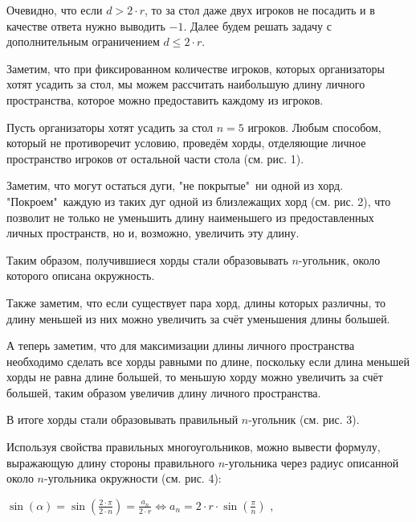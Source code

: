 \solutionSection

Очевидно, что если $d > 2 \cdot r$, то за стол даже двух игроков не посадить и в качестве ответа нужно выводить $-1$. Далее будем решать задачу с дополнительным ограничением $d \le 2 \cdot r$.

Заметим, что при фиксированном количестве игроков, которых организаторы хотят усадить за стол, мы можем рассчитать наибольшую длину личного пространства, которое можно предоставить каждому из игроков.

Пусть организаторы хотят усадить за стол $n = 5$ игроков. Любым способом, который не противоречит условию, проведём хорды, отделяющие личное пространство игроков от остальной части стола (см. рис. 1).

Заметим, что могут остаться дуги, "не покрытые"\ ни одной из хорд. "Покроем"\ каждую из таких дуг одной из близлежащих хорд (см. рис. 2), что позволит не только не уменьшить длину наименьшего из предоставленных личных пространств, но и, возможно, увеличить эту длину.

Таким образом, получившиеся хорды стали образовывать $n$-угольник, около которого описана окружность.





Также заметим, что если существует пара хорд, длины которых различны, то длину меньшей из них можно увеличить за счёт уменьшения длины большей. 

А теперь заметим, что для максимизации длины личного пространства необходимо сделать все хорды равными по длине, поскольку если длина меньшей хорды не равна длине большей, то меньшую хорду можно увеличить за счёт большей, таким образом увеличив длину личного пространства.

В итоге хорды стали образовывать правильный $n$-угольник (см. рис. 3).

Используя свойства правильных многоугольников, можно вывести формулу, выражающую длину стороны правильного $n$-угольника через радиус описанной около $n$-угольника окружности (см. рис. 4):

\begin{center}

$\sin(\alpha) = \sin(\frac{2 \cdot \pi}{2 \cdot n}) = \frac{a_n}{2 \cdot r} \Leftrightarrow a_n = 2 \cdot r \cdot \sin(\frac{\pi}{n})$ , 

\end{center}

